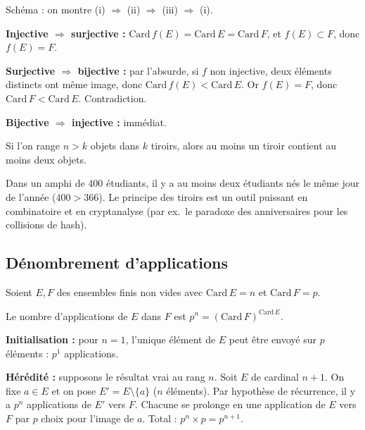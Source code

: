 \begin{proofbox}
Schéma : on montre (i) $\Rightarrow$ (ii) $\Rightarrow$ (iii) $\Rightarrow$ (i).

\medskip
\textbf{Injective $\Rightarrow$ surjective :} $\mathrm{Card}\, f(E) = \mathrm{Card}\, E = \mathrm{Card}\, F$, et $f(E) \subset F$, donc $f(E) = F$.

\textbf{Surjective $\Rightarrow$ bijective :} par l'absurde, si $f$ non injective, deux éléments distincts ont même image, donc $\mathrm{Card}\, f(E) < \mathrm{Card}\, E$. Or $f(E) = F$, donc $\mathrm{Card}\, F < \mathrm{Card}\, E$. Contradiction.

\textbf{Bijective $\Rightarrow$ injective :} immédiat.
\end{proofbox}

\begin{propbox}
Si l'on range $n > k$ objets dans $k$ tiroirs, alors au moins un tiroir contient au moins deux objets.
\end{propbox}

\begin{intuitionbox}
Dans un amphi de 400 étudiants, il y a au moins deux étudiants nés le même jour de l'année ($400 > 366$). Le principe des tiroirs est un outil puissant en combinatoire et en cryptanalyse (par ex.\ le paradoxe des anniversaires pour les collisions de hash).
\end{intuitionbox}


\subsection{Dénombrement d'applications}

Soient $E, F$ des ensembles finis non vides avec $\mathrm{Card}\, E = n$ et $\mathrm{Card}\, F = p$.

\begin{propbox}
Le nombre d'applications de $E$ dans $F$ est $p^n = (\mathrm{Card}\, F)^{\mathrm{Card}\, E}$.
\end{propbox}

\begin{proofbox}
\textbf{Initialisation :} pour $n = 1$, l'unique élément de $E$ peut être envoyé sur $p$ éléments : $p^1$ applications.

\textbf{Hérédité :} supposons le résultat vrai au rang $n$. Soit $E$ de cardinal $n+1$. On fixe $a \in E$ et on pose $E' = E \setminus \{a\}$ ($n$ éléments). Par hypothèse de récurrence, il y a $p^n$ applications de $E'$ vers $F$. Chacune se prolonge en une application de $E$ vers $F$ par $p$ choix pour l'image de $a$. Total : $p^n \times p = p^{n+1}$.
\end{proofbox}

